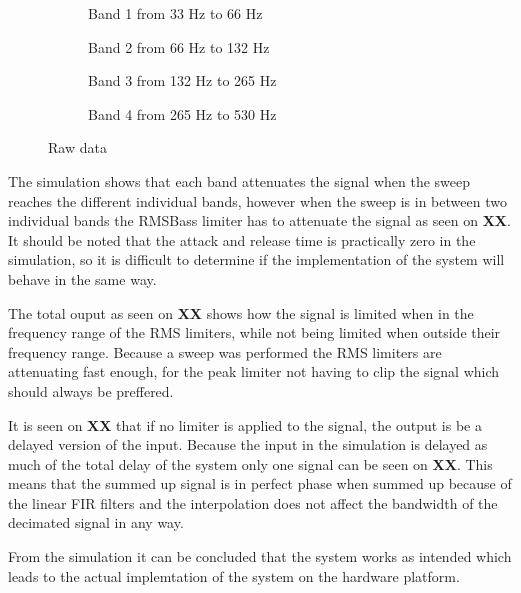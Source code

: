 \begin{figure}[H]
\centering
\begin{subfigure}[t]{0.49\textwidth}
    \centering
    
    \caption{Band 1 from 33 Hz to 66 Hz}
    \label{fig:Band1Simulation}
\end{subfigure}
\begin{subfigure}[t]{0.49\textwidth}
    \centering
    
    \caption{Band 2 from 66 Hz to 132 Hz}
    \label{fig:Band2Simulation}
\end{subfigure}
\begin{subfigure}[t]{0.49\textwidth}
    \centering
    
    \caption{Band 3 from 132 Hz to 265 Hz}
    \label{fig:Band3Simulation}
\end{subfigure}
\begin{subfigure}[t]{0.49\textwidth}
    \centering
    
    \caption{Band 4 from 265 Hz to 530 Hz}
    \label{fig:Band4Simulation}
\end{subfigure}
\caption{Raw data}
\label{fig:SimulationComparisson}
\end{figure} 

The simulation shows that each band attenuates the signal when the sweep reaches the different individual bands, however when the sweep is in between two individual bands the RMSBass limiter has to attenuate the signal as seen on \textbf{XX}. It should be noted that the attack and release time is practically zero in the simulation, so it is difficult to determine if the implementation of the system will behave in the same way. 



The total ouput as seen on \textbf{XX} shows how the signal is limited when in the frequency range of the RMS limiters, while not being limited when outside their frequency range. Because a sweep was performed the RMS limiters are attenuating fast enough, for the peak limiter not having to clip the signal which should always be preffered.


It is seen on \textbf{XX} that if no limiter is applied to the signal, the output is be a delayed version of the input. Because the input in the simulation is delayed as much of the total delay of the system only one signal can be seen on \textbf{XX}. This means that the summed up signal is in perfect phase when summed up because of the linear FIR filters and the interpolation does not affect the bandwidth of the decimated signal in any way.      



From the simulation it can be concluded that the system works as intended which leads to the actual implemtation of the system on the hardware platform. 
   

 




